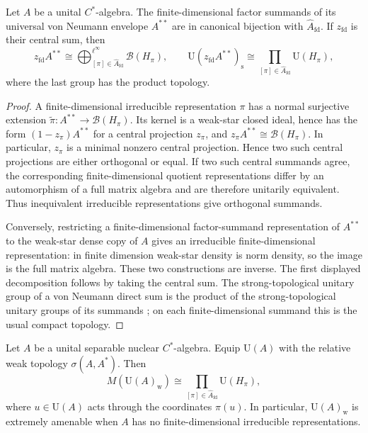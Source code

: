 \begin{lemma}\label{lem:pw-finite-dimensional-envelope-summands}
Let \(A\) be a unital \(C^*\)-algebra. The finite-dimensional factor summands
of its universal von Neumann envelope \(A^{**}\) are in canonical bijection
with \(\widehat A_{\mathrm{fd}}\). If \(z_{\mathrm{fd}}\) is their central
sum, then
\[
 z_{\mathrm{fd}}A^{**}
 \cong
 \bigoplus_{[\pi]\in\widehat A_{\mathrm{fd}}}^{\ell^\infty}
 \mathcal B(H_\pi),
\qquad
 \mathrm U(z_{\mathrm{fd}}A^{**})_{\mathrm s}
 \cong
 \prod_{[\pi]\in\widehat A_{\mathrm{fd}}}\mathrm U(H_\pi),
\]
where the last group has the product topology.
\end{lemma}

\begin{proof}
A finite-dimensional irreducible representation \(\pi\) has a normal
surjective extension
\(\widetilde\pi:A^{**}\to\mathcal B(H_\pi)\). Its kernel is a weak-star
closed ideal, hence has the form \((1-z_\pi)A^{**}\) for a central projection
\(z_\pi\), and
\(z_\pi A^{**}\cong\mathcal B(H_\pi)\). In particular, \(z_\pi\) is a
minimal nonzero central projection. Hence two such central projections are
either orthogonal or equal. If two such central summands agree,
the corresponding finite-dimensional quotient representations differ by an
automorphism of a full matrix algebra and are therefore unitarily equivalent.
Thus inequivalent irreducible representations give orthogonal summands.

Conversely, restricting a finite-dimensional factor-summand representation of
\(A^{**}\) to the weak-star dense copy of \(A\) gives an irreducible
finite-dimensional representation: in finite dimension weak-star density is
norm density, so the image is the full matrix algebra. These two constructions
are inverse. The first displayed decomposition follows by taking the central
sum. The strong-topological unitary group of a von Neumann direct sum is the
product of the strong-topological unitary groups of its summands
\cite[Lemma~3.1]{GiordanoPestov2007}; on each finite-dimensional summand this is the usual
compact topology.
\end{proof}

\begin{theorem}\label{thm:pw-nuclear-weak-umf}
Let \(A\) be a unital separable nuclear \(C^*\)-algebra. Equip
\(\mathrm U(A)\) with the relative weak topology \(\sigma(A,A^*)\). Then
\[
M(\mathrm U(A)_{\mathrm w})
 \cong
 \prod_{[\pi]\in\widehat A_{\mathrm{fd}}}\mathrm U(H_\pi),
\]
where \(u\in\mathrm U(A)\) acts through the coordinates \(\pi(u)\).
In particular, \(\mathrm U(A)_{\mathrm w}\) is extremely amenable when
\(A\) has no finite-dimensional irreducible representations.
\end{theorem}

